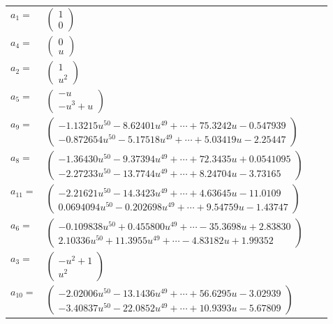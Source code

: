 \documentclass[1p]{elsarticle_modified}
\theoremstyle{definition}
\begin{document}
\begin{tabular}{m{7pt} m{180pt} m{7pt} m{180pt} }
\flushright $a_{1}=$&$\begin{pmatrix}1\\0\end{pmatrix}$ \\
\flushright $a_{4}=$&$\begin{pmatrix}0\\u\end{pmatrix}$ \\
\flushright $a_{2}=$&$\begin{pmatrix}1\\u^2\end{pmatrix}$ \\
\flushright $a_{5}=$&$\begin{pmatrix}- u\\- u^3+u\end{pmatrix}$ \\
\flushright $a_{9}=$&$\begin{pmatrix}-1.13215 u^{50}-8.62401 u^{49}+\cdots+75.3242 u-0.547939\\-0.872654 u^{50}-5.17518 u^{49}+\cdots+5.03419 u-2.25447\end{pmatrix}$ \\
\flushright $a_{8}=$&$\begin{pmatrix}-1.36430 u^{50}-9.37394 u^{49}+\cdots+72.3435 u+0.0541095\\-2.27233 u^{50}-13.7744 u^{49}+\cdots+8.24704 u-3.73165\end{pmatrix}$ \\
\flushright $a_{11}=$&$\begin{pmatrix}-2.21621 u^{50}-14.3423 u^{49}+\cdots+4.63645 u-11.0109\\0.0694094 u^{50}-0.202698 u^{49}+\cdots+9.54759 u-1.43747\end{pmatrix}$ \\
\flushright $a_{6}=$&$\begin{pmatrix}-0.109838 u^{50}+0.455800 u^{49}+\cdots-35.3698 u+2.83830\\2.10336 u^{50}+11.3955 u^{49}+\cdots-4.83182 u+1.99352\end{pmatrix}$ \\
\flushright $a_{3}=$&$\begin{pmatrix}- u^2+1\\u^2\end{pmatrix}$ \\
\flushright $a_{10}=$&$\begin{pmatrix}-2.02006 u^{50}-13.1436 u^{49}+\cdots+56.6295 u-3.02939\\-3.40837 u^{50}-22.0852 u^{49}+\cdots+10.9393 u-5.67809\end{pmatrix}$ \\

\end{tabular}
\end{document}
